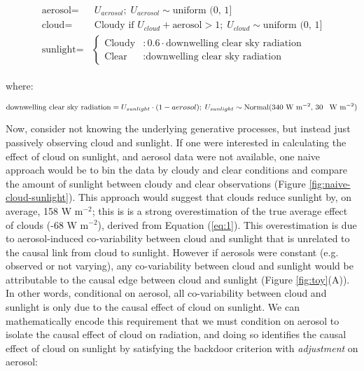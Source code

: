 \documentclass[12pt]{article}
\begin{document}
\begin{align}
  \begin{split}
    \text{aerosol} =& \; U_{aerosol}; \; U_{aerosol} \sim
    \text{uniform (0, 1]}\\ \text{cloud} =& \; \text{Cloudy if } U_{cloud} +
    \text{aerosol} > 1; \; U_{cloud} \sim \text{uniform (0, 1]}\\ \text{sunlight}
    =& \begin{cases} \text{Cloudy} &: 0.6 \cdot \text{downwelling clear
        sky radiation} \\ \text{Clear} &: \text{downwelling clear sky
        radiation}
    \end{cases}
    \label{eq:1}
  \end{split}
\end{align}

where:

\begin{equation*} \text{downwelling clear sky radiation} =
  U_{sunlight} \cdot (1 - aerosol); \; U_{sunlight} \sim
  \text{Normal(340 W m$^{-2}$, 30 \, W m$^{-2}$)}
\end{equation*}

Now, consider not knowing the underlying generative processes, but
instead just passively observing cloud and sunlight. If one were
interested in calculating the effect of cloud on sunlight, and aerosol
data were not available, one naive approach would be to bin the data
by cloudy and clear conditions and compare the amount of sunlight
between cloudy and clear observations (Figure
\ref{fig:naive-cloud-sunlight}). This approach would suggest that
clouds reduce sunlight by, on average, 158 W m$^{-2}$; this is is a
strong overestimation of the true average effect of clouds (-68 W
m$^{-2}$), derived from Equation (\ref{eq:1}). This overestimation is
due to aerosol-induced co-variability between cloud and sunlight that
is unrelated to the causal link from cloud to sunlight. However if
aerosols were constant (e.g. observed or not varying), any
co-variability between cloud and sunlight would be attributable to the
causal edge between cloud and sunlight (Figure \ref{fig:toy}(A)). In
other words, conditional on aerosol, all co-variability between cloud
and sunlight is only due to the causal effect of cloud on sunlight.
We can mathematically encode this requirement that we must condition
on aerosol to isolate the causal effect of cloud on radiation, and
doing so identifies the causal effect of cloud on sunlight by
satisfying the backdoor criterion with \textit{adjustment} on aerosol:
\end{document}
